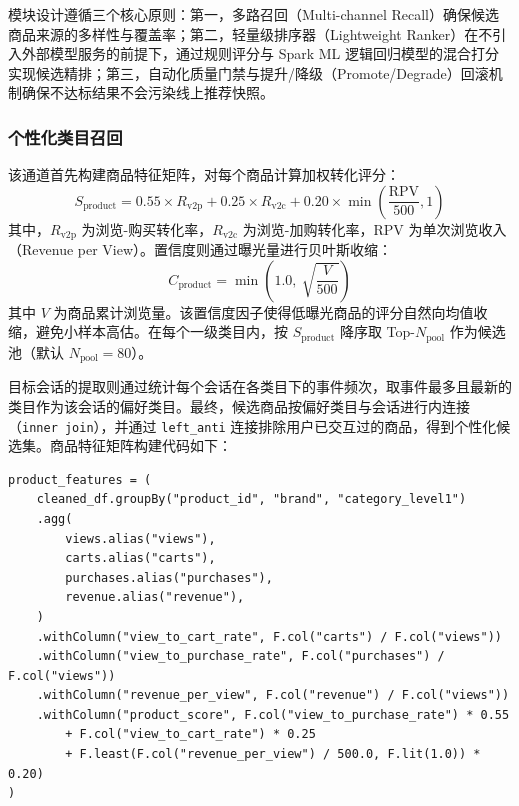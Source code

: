 模块设计遵循三个核心原则：第一，多路召回（Multi-channel Recall）确保候选商品来源的多样性与覆盖率；第二，轻量级排序器（Lightweight Ranker）在不引入外部模型服务的前提下，通过规则评分与 Spark ML 逻辑回归模型的混合打分实现候选精排；第三，自动化质量门禁与提升/降级（Promote/Degrade）回滚机制确保不达标结果不会污染线上推荐快照。

\subsubsection{个性化类目召回}

该通道首先构建商品特征矩阵，对每个商品计算加权转化评分：
\begin{equation}
    S_{\text{product}} = 0.55 \times R_{\text{v2p}} + 0.25 \times R_{\text{v2c}} + 0.20 \times \min\left(\frac{\text{RPV}}{500}, 1\right)
    \label{eq:product-score}
\end{equation}
其中，$R_{\text{v2p}}$ 为浏览-购买转化率，$R_{\text{v2c}}$ 为浏览-加购转化率，$\text{RPV}$ 为单次浏览收入（Revenue per View）。置信度则通过曝光量进行贝叶斯收缩：
\begin{equation}
    C_{\text{product}} = \min\left(1.0,\ \sqrt{\frac{V}{500}}\right)
    \label{eq:product-confidence}
\end{equation}
其中 $V$ 为商品累计浏览量。该置信度因子使得低曝光商品的评分自然向均值收缩，避免小样本高估。在每个一级类目内，按 $S_{\text{product}}$ 降序取 Top-$N_{\text{pool}}$ 作为候选池（默认 $N_{\text{pool}}=80$）。

目标会话的提取则通过统计每个会话在各类目下的事件频次，取事件最多且最新的类目作为该会话的偏好类目。最终，候选商品按偏好类目与会话进行内连接（\texttt{inner join}），并通过 \texttt{left\_anti} 连接排除用户已交互过的商品，得到个性化候选集。商品特征矩阵构建代码如下：
\begin{lstlisting}[style=codexcode]
product_features = (
    cleaned_df.groupBy("product_id", "brand", "category_level1")
    .agg(
        views.alias("views"),
        carts.alias("carts"),
        purchases.alias("purchases"),
        revenue.alias("revenue"),
    )
    .withColumn("view_to_cart_rate", F.col("carts") / F.col("views"))
    .withColumn("view_to_purchase_rate", F.col("purchases") / F.col("views"))
    .withColumn("revenue_per_view", F.col("revenue") / F.col("views"))
    .withColumn("product_score", F.col("view_to_purchase_rate") * 0.55
        + F.col("view_to_cart_rate") * 0.25
        + F.least(F.col("revenue_per_view") / 500.0, F.lit(1.0)) * 0.20)
)
\end{lstlisting}

